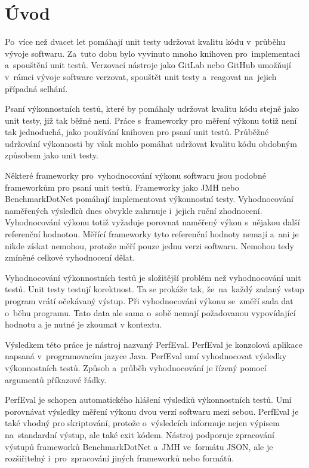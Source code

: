 \chapter*{Úvod}

Po~více než dvacet let pomáhají unit testy udržovat kvalitu kódu v~průběhu vývoje
softwaru. Za~tuto dobu bylo vyvinuto mnoho knihoven pro~implementaci a~spouštění
unit testů. Verzovací nástroje jako GitLab nebo GitHub umožňují v~rámci vývoje
software verzovat, spouštět unit testy a~reagovat na~jejich případná selhání.

Psaní výkonnostních testů, které by pomáhaly udržovat kvalitu kódu stejně jako unit testy,
již tak běžné není. Práce s~frameworky pro měření výkonu totiž není tak jednoduchá,
jako používání knihoven pro psaní unit testů. Průběžné udržování výkonnosti by však mohlo
pomáhat udržovat kvalitu kódu obdobným způsobem jako unit testy.

Některé frameworky pro~vyhodnocování výkonu softwaru jsou podobné frameworkům pro psaní unit testů.
Frameworky jako JMH nebo BenchmarkDotNet pomáhají implementovat výkonnostní testy.
Vyhodnocování naměřených výsledků dnes obvykle zahrnuje i~jejich ruční zhodnocení.
Vyhodnocování výkonu totiž vyžaduje porovnat naměřený výkon s~nějakou další referenční hodnotou.
Měřící frameworky tyto referenční hodnoty nemají a~ani je nikde získat nemohou,
protože měří pouze jednu verzi softwaru. Nemohou tedy zmíněné celkové vyhodnocení dělat.

Vyhodnocování výkonnostních testů je složitější problém než vyhodnocování unit testů.
Unit testy testují korektnost. Ta se prokáže tak, že~na~každý zadaný vstup program vrátí očekávaný výstup. Při vyhodnocování
výkonu se~změří sada dat o~běhu programu. Tato data ale sama o~sobě nemají požadovanou
vypovídající hodnotu a je nutné je zkoumat v kontextu.

Výsledkem této práce je nástroj nazvaný PerfEval. PerfEval je konzolová aplikace
napsaná v~programovacím jazyce Java. PerfEval umí vyhodnocovat výsledky
výkonnostních testů. Způsob a~průběh vyhodnocování je řízený pomocí argumentů příkazové řádky.

PerfEval je schopen automatického hlášení výsledků výkonnostních testů. Umí porovnávat
výsledky měření výkonu dvou verzí softwaru mezi sebou. PerfEval je také vhodný pro
skriptování, protože o~výsledcích informuje nejen výpisem na~standardní výstup, ale
také exit kódem. Nástroj podporuje zpracování výstupů frameworků BenchmarkDotNet a~JMH ve~formátu JSON,
ale je rozšiřitelný i~pro~zpracování jiných frameworků nebo formátů.
